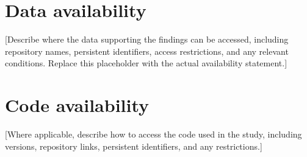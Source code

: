 \section*{Data availability}
[Describe where the data supporting the findings can be accessed, including
repository names, persistent identifiers, access restrictions, and any relevant
conditions. Replace this placeholder with the actual availability statement.]

\section*{Code availability}
[Where applicable, describe how to access the code used in the study, including
versions, repository links, persistent identifiers, and any restrictions.]
